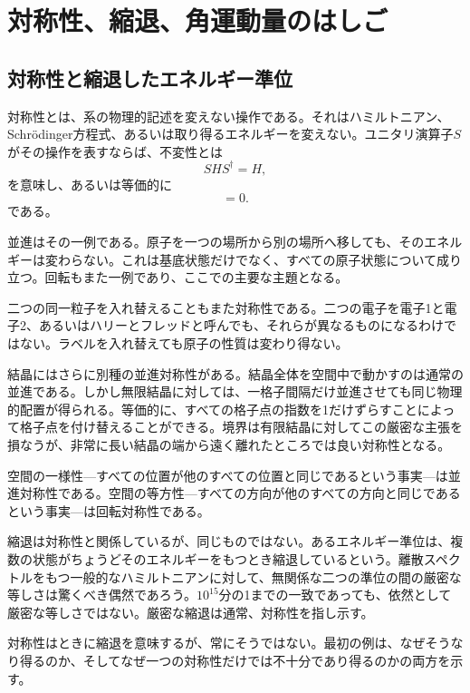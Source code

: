 \chapter{対称性、縮退、角運動量のはしご}
\providecommand{\ket}[1]{\left\lvert#1\right\rangle}

\section{対称性と縮退したエネルギー準位}

対称性とは、系の物理的記述を変えない操作である。それはハミルトニアン、Schr\"odinger方程式、あるいは取り得るエネルギーを変えない。ユニタリ演算子\(S\)がその操作を表すならば、不変性とは
\begin{equation}
S H S^\dagger=H,
\end{equation}
を意味し、あるいは等価的に
\begin{equation}
[S,H]=0.
\end{equation}
である。

並進はその一例である。原子を一つの場所から別の場所へ移しても、そのエネルギーは変わらない。これは基底状態だけでなく、すべての原子状態について成り立つ。回転もまた一例であり、ここでの主要な主題となる。

二つの同一粒子を入れ替えることもまた対称性である。二つの電子を電子1と電子2、あるいはハリーとフレッドと呼んでも、それらが異なるものになるわけではない。ラベルを入れ替えても原子の性質は変わり得ない。

結晶にはさらに別種の並進対称性がある。結晶全体を空間中で動かすのは通常の並進である。しかし無限結晶に対しては、一格子間隔だけ並進させても同じ物理的配置が得られる。等価的に、すべての格子点の指数を1だけずらすことによって格子点を付け替えることができる。境界は有限結晶に対してこの厳密な主張を損なうが、非常に長い結晶の端から遠く離れたところでは良い対称性となる。

空間の一様性---すべての位置が他のすべての位置と同じであるという事実---は並進対称性である。空間の等方性---すべての方向が他のすべての方向と同じであるという事実---は回転対称性である。

縮退は対称性と関係しているが、同じものではない。あるエネルギー準位は、複数の状態がちょうどそのエネルギーをもつとき縮退しているという。離散スペクトルをもつ一般的なハミルトニアンに対して、無関係な二つの準位の間の厳密な等しさは驚くべき偶然であろう。\(10^{15}\)分の1までの一致であっても、依然として厳密な等しさではない。厳密な縮退は通常、対称性を指し示す。

対称性はときに縮退を意味するが、常にそうではない。最初の例は、なぜそうなり得るのか、そしてなぜ一つの対称性だけでは不十分であり得るのかの両方を示す。

